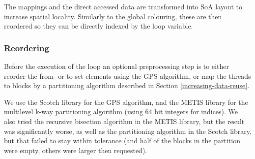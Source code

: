 The mappings and the direct accessed data are transformed into SoA layout to
increase spatial locality. Similarly to the global colouring, these are then
reordered so they can be directly indexed by the loop variable.

\subsubsection{Reordering}

Before the execution of the loop an optional preprocessing step is to either
reorder the from- or to-set elements using the GPS algorithm, or map the threads
to blocks by a partitioning algorithm described in Section
\ref{increasing-data-reuse}.

We use the Scotch library\cite{scotch} for the GPS algorithm, and the
METIS\cite{metis} library for the multilevel k-way partitioning algorithm (using
64 bit integers for indices). We also tried the recursive bisection algorithm in
the METIS library, but the result was significantly worse, as well as the
partitioning algorithm in the Scotch library, but that failed to stay within
tolerance (and half of the blocks in the partition were empty, others were
larger then requested).

